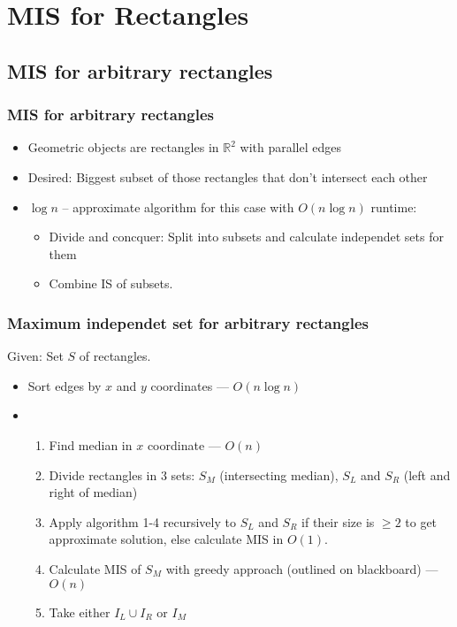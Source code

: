 \documentclass{beamer}
\begin{document}
\section{MIS for Rectangles}
\subsection{MIS for arbitrary rectangles}
\begin{frame}
\frametitle{MIS for arbitrary rectangles \cite{agarwallabel}}
\begin{itemize}
\item Geometric objects are rectangles in $\mathbb R^2$ with parallel edges
\item Desired: Biggest subset of those rectangles that don't intersect each other
\item $\log n$ -- approximate algorithm for this case with $O(n\log n)$ runtime: 
\begin{itemize}
\item Divide and concquer: Split into subsets and calculate independet sets for them
\item Combine IS of subsets.
\end{itemize}
\end{itemize}
\end{frame}

\begin{frame}
\frametitle{Maximum independet set for arbitrary rectangles}
Given: Set $S$ of rectangles.
\begin{itemize}
\item<1-> Sort edges by $x$ and $y$ coordinates --- $O(n\log n)$
\item<2-> \begin{enumerate}
\item<2-> Find median in $x$ coordinate --- $O(n)$
\item<3-> Divide rectangles in 3 sets: $S_M$ (intersecting median), $S_L$ and $S_R$ (left and right of median)
\item<4-> Apply algorithm 1-4 recursively to $S_L$ and $S_R$ if their size is $\geq 2$ to get approximate solution, else calculate MIS in $O(1)$.
\item<5-> Calculate MIS of $S_M$ with greedy approach (outlined on blackboard) --- $O(n)$
\item<6-> Take either $I_L \cup I_R$ or $I_M$ 
\end{enumerate}
\end{itemize}

\end{frame}
\end{document}
